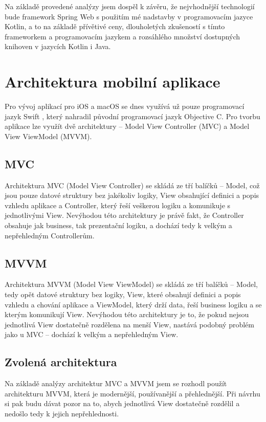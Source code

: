 Na základě provedené analýzy jsem dospěl k závěru, že nejvhodnější technologií bude framework Spring Web s použitím mé nadstavby v programovacím jazyce Kotlin, a to na základě přívětivé ceny, dlouholetých zkušeností s tímto frameworkem a programovacím jazykem a rozsáhlého množství dostupných knihoven v jazycích Kotlin i Java.

\section{Architektura mobilní aplikace}

Pro vývoj aplikací pro iOS a macOS se dnes využívá už pouze programovací jazyk Swift \cite{swift}, který nahradil původní programovací jazyk Objective C. Pro tvorbu aplikace lze využít dvě architektury -- Model View Controller (MVC) a Model View ViewModel (MVVM). \cite{mvc-mvvm}

\subsection{MVC}

Architektura MVC (Model View Controller) se skládá ze tří balíčků -- Model, což jsou pouze datové struktury bez jakékoliv logiky, View obsahující definici a popis vzhledu aplikace a Controller, který řeší veškerou logiku a komunikuje s jednotlivými View. \cite{mvc-mvvm} Nevýhodou této architektury je právě fakt, že Controller obsahuje jak business, tak prezentační logiku, a dochází tedy k velkým a nepřehledným Controllerům.

\subsection{MVVM}

Architektura MVVM (Model View ViewModel) se skládá ze tří balíčků -- Model, tedy opět datové struktury bez logiky, View, které obsahují definici a popis vzhledu a chování aplikace a ViewModel, který drží data, řeší business logiku a se kterým komunikují View. \cite{mvc-mvvm} Nevýhodou této architektury je to, že pokud nejsou jednotlivá View dostatečně rozdělena na menší View, nastává podobný problém jako u MVC -- dochází k velkým a nepřehledným View.

\subsection{Zvolená architektura}

Na základě analýzy architektur MVC a MVVM jsem se rozhodl použít architekturu MVVM, která je modernější, používanější a přehlednější. Při návrhu si pak budu dávat pozor na to, abych jednotlivá View dostatečně rozdělil a nedošlo tedy k jejich nepřehlednosti.

